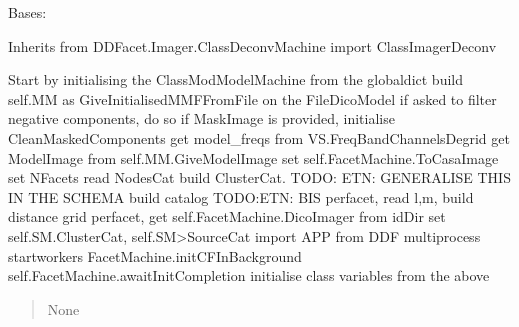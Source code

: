 \documentclass[letterpaper,10pt,english]{sphinxmanual}
\begin{document}
\begin{fulllineitems}
\label{\detokenize{api/killMS.Predict:killMS.Predict.ClassImageSM2.ClassPreparePredict}}
\pysigstartsignatures
{}
\pysigstopsignatures
\sphinxAtStartPar
Bases: 

\sphinxAtStartPar
Inherits from DDFacet.Imager.ClassDeconvMachine import ClassImagerDeconv

\begin{fulllineitems}
\label{\detokenize{api/killMS.Predict:killMS.Predict.ClassImageSM2.ClassPreparePredict.LoadModel}}
\pysigstartsignatures
{}
\pysigstopsignatures
\sphinxAtStartPar
Start by initialising the ClassModModelMachine from the globaldict
build self.MM as GiveInitialisedMMFFromFile on the FileDicoModel
if asked to filter negative components, do so
if MaskImage is provided, initialise CleanMaskedComponents
get model\_freqs from VS.FreqBandChannelsDegrid
get ModelImage from self.MM.GiveModelImage
set self.FacetMachine.ToCasaImage
set NFacets
read NodesCat
build ClusterCat. TODO: ETN: GENERALISE THIS IN THE SCHEMA
build catalog TODO:ETN: BIS
per\sphinxhyphen{}facet, read l,m, build distance grid
per\sphinxhyphen{}facet, get self.FacetMachine.DicoImager from idDir
set self.SM.ClusterCat, self.SM\textgreater{}SourceCat
import APP from DDF multiprocess
startworkers
FacetMachine.initCFInBackground
self.FacetMachine.awaitInitCompletion
initialise class variables from the above
\begin{quote}\begin{description}
\sphinxAtStartPar
None

\end{description}\end{quote}

\end{fulllineitems}



\end{fulllineitems}
\end{document}
